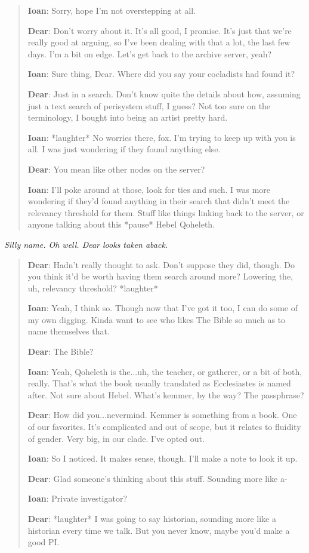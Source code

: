 \begin{quote}
\textbf{Ioan}: Sorry, hope I'm not overstepping at all.

\textbf{Dear}: Don't worry about it. It's all good, I promise. It's just that we're really good at arguing, so I've been dealing with that a lot, the last few days. I'm a bit on edge. Let's get back to the archive server, yeah?

\textbf{Ioan}: Sure thing, Dear. Where did you say your cocladists had found it?

\textbf{Dear}: Just in a search. Don't know quite the details about how, assuming just a text search of perisystem stuff, I guess? Not too sure on the terminology, I bought into being an artist pretty hard.

\textbf{Ioan}: *laughter* No worries there, fox. I'm trying to keep up with you is all. I was just wondering if they found anything else.

\textbf{Dear}: You mean like other nodes on the server?

\textbf{Ioan}: I'll poke around at those, look for ties and such. I was more wondering if they'd found anything in their search that didn't meet the relevancy threshold for them. Stuff like things linking back to the server, or anyone talking about this *pause* Hebel Qoheleth.
\end{quote}

\emph{Silly name. Oh well. Dear looks taken aback.}

\begin{quote}
\textbf{Dear}: Hadn't really thought to ask. Don't suppose they did, though. Do you think it'd be worth having them search around more? Lowering the, uh, relevancy threshold? *laughter*

\textbf{Ioan}: Yeah, I think so. Though now that I've got it too, I can do some of my own digging. Kinda want to see who likes The Bible so much as to name themselves that.

\textbf{Dear}: The Bible?

\textbf{Ioan}: Yeah, Qoheleth is the...uh, the teacher, or gatherer, or a bit of both, really. That's what the book usually translated as Ecclesiastes is named after. Not sure about Hebel. What's kemmer, by the way? The passphrase?

\textbf{Dear}: How did you...nevermind. Kemmer is something from a book. One of our favorites. It's complicated and out of scope, but it relates to fluidity of gender. Very big, in our clade. I've opted out.

\textbf{Ioan}: So I noticed. It makes sense, though. I'll make a note to look it up.

\textbf{Dear}: Glad someone's thinking about this stuff. Sounding more like a-

\textbf{Ioan}: Private investigator?

\textbf{Dear}: *laughter* I was going to say historian, sounding more like a historian every time we talk. But you never know, maybe you'd make a good PI.
\end{quote}


